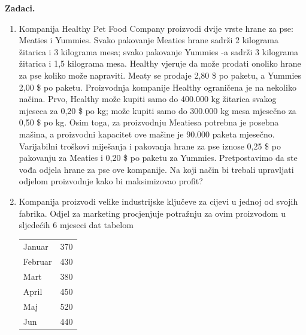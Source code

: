 \documentclass[a4paper, utf8, 11pt, colorlinks]{book}
\begin{document}
\textbf{\Large Zadaci.}
\begin{enumerate}
	\item  Kompanija Healthy Pet Food Company proizvodi dvije vrste hrane za pse: Meaties i Yummies. Svako pakovanje Meaties hrane sadrži 2 kilograma žitarica i 3 kilograma mesa; svako pakovanje Yummies -a sadrži 3 kilograma žitarica i 1,5 kilograma mesa. Healthy vjeruje da može prodati onoliko hrane za pse koliko može napraviti. Meaty se prodaje   2,80 \$ po paketu, a Yummies   2,00 \$ po paketu. Proizvodnja kompanije Healthy ograničena je na nekoliko načina. Prvo, Healthy može kupiti samo do 400.000 kg žitarica svakog mjeseca za 0,20 \$ po kg; može
	kupiti samo do 300.000 kg mesa mjesečno za 0,50 \$ po kg. Osim toga, za proizvodnju Meatiesa potrebna je posebna mašina, a proizvodni kapacitet ove mašine je 90.000 paketa mjesečno. Varijabilni troškovi miješanja i pakovanja hrane za pse iznose 0,25 \$ po pakovanju za Meaties i 0,20 \$ po paketu za Yummies.  
	Pretpostavimo da ste vođa odjela hrane za pse  ove kompanije. Na koji način bi trebali upravljati odjelom proizvodnje kako bi maksimizovao   profit? 
	\item  Kompanija proizvodi velike industrijske ključeve za cijevi u jednoj od svojih fabrika. Odjel za marketing procjenjuje potražnju za ovim proizvodom u sljedećih 6
	mjeseci dat tabelom
 \begin{center}
    \begin{tabular}{lc}\hline
		 Januar  & 370 \\
		 Februar & 430 \\
		 Mart    & 380 \\
		 April   & 450 \\
		 Maj     & 520 \\
		 Jun     & 440 \\
		 \hline
	\end{tabular}  
\end{center}	
	

\end{enumerate}
\end{document}
